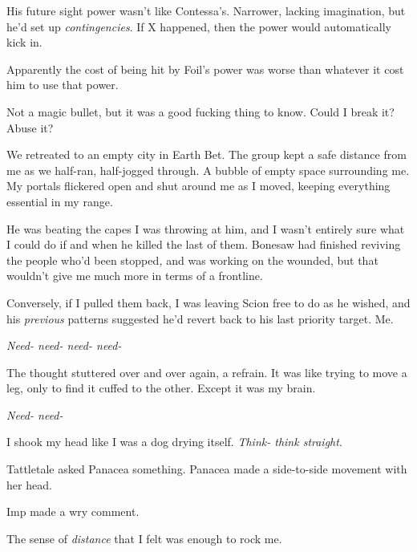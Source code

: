 His future sight power wasn't like Contessa's.  Narrower, lacking imagination, but he'd set up \emph{contingencies}.  If X happened, then the power would automatically kick in.



Apparently the cost of being hit by Foil's power was worse than whatever it cost him to use that power.



Not a magic bullet, but it was a good fucking thing to know.  Could I break it?  Abuse it?



We retreated to an empty city in Earth Bet.  The group kept a safe distance from me as we half-ran, half-jogged through.  A bubble of empty space surrounding me.  My portals flickered open and shut around me as I moved, keeping everything essential in my range.



He was beating the capes I was throwing at him, and I wasn't entirely sure what I could do if and when he killed the last of them.  Bonesaw had finished reviving the people who'd been stopped\emph{, }and was working on the wounded, but that wouldn't give me much more in terms of a frontline.



Conversely, if I pulled them back, I was leaving Scion free to do as he wished, and his \emph{previous} patterns suggested he'd revert back to his last priority target.  Me.



\emph{Need- need- need- need-}



The thought stuttered over and over again, a refrain.  It was like trying to move a leg, only to find it cuffed to the other.  Except it was my brain.



\emph{Need- need-}



I shook my head like I was a dog drying itself.  \emph{Think- think straight}.



Tattletale asked Panacea something.  Panacea made a side-to-side movement with her head.



Imp made a wry comment.



The sense of \emph{distance} that I felt was enough to rock me.



